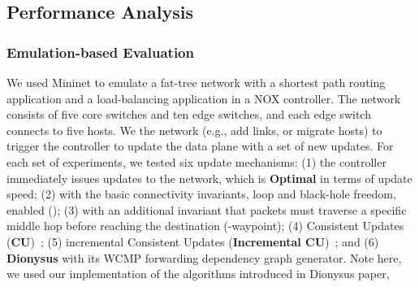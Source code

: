 \subsection{ Performance Analysis}
\label{sec:parallel}

\subsubsection{Emulation-based Evaluation}

We used Mininet to emulate a fat-tree network with a shortest path routing application and a load-balancing application in a NOX controller. The network consists of five core switches
and ten edge switches, and each edge switch connects to five hosts. %
We  the network (e.g., add links, or migrate hosts) to trigger the controller to update the data plane with a set of new updates. 
For each set of experiments, we tested six update mechanisms: (1) the controller immediately issues updates to the network, which is \textbf{Optimal} in terms of update speed; (2) \textbf{\name} with the basic connectivity invariants, loop and black-hole freedom, enabled (\name); (3) \name with an additional invariant that packets must traverse a specific middle hop before reaching the destination (\name-waypoint); (4) Consistent Updates (\textbf{CU})~\cite{Reitblatt2012}; (5) incremental Consistent Updates (\textbf{Incremental CU})~\cite{incremental-cu}; and (6) \textbf{Dionysus} \cite{jin2014dynamic} with its WCMP forwarding dependency graph generator.
Note here, we used our  implementation of the algorithms introduced in Dionysus paper, 

